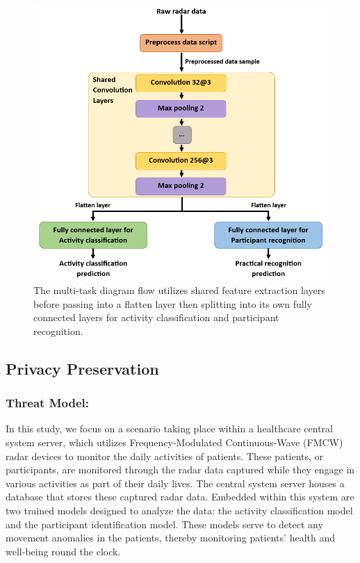 \documentclass{l4proj}
\begin{document}
\begin{figure}[h]
    \centering
    \includegraphics[width=0.7\linewidth]{images/multi-task-model-detailed.png}
    \caption{The multi-task diagram flow utilizes shared feature extraction layers before passing into a flatten layer then splitting into its own fully connected layers for activity classification and participant recognition.}
    \label{fig:multi-task-model}
\end{figure}

\subsection{Privacy Preservation}
\subsubsection{Threat Model:}
In this study, we focus on a scenario taking place within a healthcare central system server, which utilizes Frequency-Modulated Continuous-Wave (FMCW) radar devices to monitor the daily activities of patients. These patients, or participants, are monitored through the radar data captured while they engage in various activities as part of their daily lives. The central system server houses a database that stores these captured radar data. Embedded within this system are two trained models designed to analyze the data: the activity classification model and the participant identification model. These models serve to detect any movement anomalies in the patients, thereby monitoring patients' health and well-being round the clock.
\end{document}
